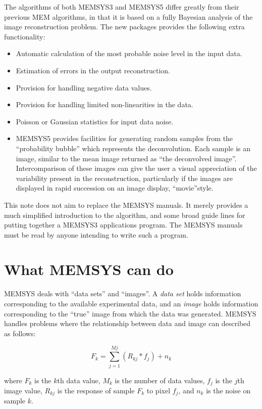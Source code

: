 The algorithms of both MEMSYS3 and MEMSYS5 differ greatly from their previous
MEM algorithms, in
that it is based on a fully Bayesian analysis of the image reconstruction
problem. The new packages provides the following extra functionality:
\begin {itemize}
\item Automatic calculation of the most probable noise level in the input
data.
\item Estimation of errors in the output reconstruction.
\item Provision for handling negative data values.
\item Provision for handling limited non-linearities in the data.
\item Poisson or Gaussian statistics for input data noise.
\item MEMSYS5 provides facilities for generating random samples from the
``probability bubble'' which represents the deconvolution. Each sample is an
image, similar to the mean image returned as ``the deconvolved image''.
Intercomparison of these images can give the user a visual appreciation of the
variability present in the reconstruction, particularly if the images are
displayed in rapid succession on an image display, ``movie''style.
\end {itemize}

This note does not aim to replace the MEMSYS manuals. It merely provides
a much simplified introduction to the algorithm, and some broad guide lines for
putting together a MEMSYS3 applications program. The MEMSYS manuals must be
read by anyone intending to write such a program.

\section {What MEMSYS can do}
MEMSYS deals with ``data sets'' and ``images''. A {\em data set} holds
information corresponding to the available experimental data, and an {\em image}
holds information corresponding to the ``true'' image from which the data was
generated. MEMSYS handles problems where the relationship between data and
image can described as follows:

\begin {equation}
F_{k}=\sum_{j=1}^{Mj} (R_{kj}*f_{j})+n_{k}  \label {EQ:DATA}
\end {equation}

where $F_{k}$ is the $k$th data value, $M_{k}$ is the number of data values,
$f_{j}$ is the $j$th image value, $R_{kj}$ is the response of sample $F_{k}$ to
pixel $f_{j}$, and $n_{k}$ is the noise on sample $k$.

